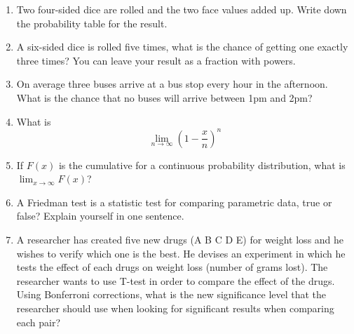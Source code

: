 \documentclass{article}
\newif\ifanswer
\begin{document}
\begin{enumerate}
  \ifanswer
    Solution: In the obvious notation we need $p(M)$:
  $$p(M)=p(M|B)p(B)+p(M|Y)p(Y)=0.1+0.4=0.5$$
  and using Bayes:
  $$p(Y|M)=p(M|Y)p(Y)/p(M)=0.4/0.5=0.8$$
  \fi

\item Two four-sided dice are rolled and the two face values added up. Write down the probability table for the result.

  \ifanswer   Solution: $p(2)=1/16$, $p(3)=1/8$, $p(4)=3/16$, $p(5)=1/4$, $p(6)=3/16$, $p(7)=1/8$ and $p(8)=1/16$.
  \fi

  \item A six-sided dice is rolled five times, what is the chance of
    getting one exactly three times? You can leave your result as a fraction with powers.

    \ifanswer  Solution: 
    $$p=\left(\begin{array}{c}5\\3\end{array}\right)\frac{1}{6}^3\frac{5}{6}^2
      = \frac{20\times 5^2}{2\times 6^5}
      $$
      \fi

    \item On average three buses arrive at a bus stop every hour in the afternoon. What is the chance that no buses will arrive between 1pm and 2pm?

      \ifanswer  Solution: 
      $$p=e^{-3}$$
      \fi

    \item What is
      $$\lim_{n\rightarrow\infty}\left(1-\frac{x}{n}\right)^n$$

      \ifanswer
        Solution: 
      $$\lim_{n\rightarrow\infty}\left(1-\frac{x}{n}\right)^n=e^{-x}$$
        \fi
        
    \item If $F(x)$ is the cumulative for a continuous probability distribution, what is $\lim_{x\rightarrow\infty}F(x)$?

      \ifanswer
        Solution: 
      $$\lim_{x\rightarrow\infty}F(x)=1$$
  \fi
\item A Friedman test is a statistic test for comparing parametric data,
true or false? Explain yourself in one sentence.

\ifanswer
(Answer: False this is used for comparing non-parametric data, i.e. with a skewed distribution)
\fi

\item A researcher has created five new drugs (A B C D E) for weight loss and he wishes to verify which one is the best. He devises an experiment in which he tests the effect of each drugs on weight loss (number of grams lost). The researcher wants to use T-test in order to compare the effect of the drugs. Using Bonferroni corrections, what is the new significance level that the researcher should use when looking for significant results when comparing each pair?


\end{enumerate}
\end{document}
